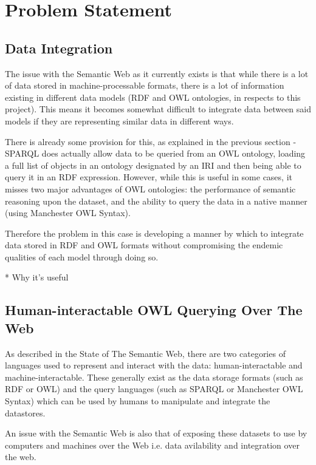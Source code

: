 \documentclass{article}
\begin{document}
\section{Problem Statement}

\subsection{Data Integration}

The issue with the Semantic Web as it currently exists is that while there is a
lot of data stored in machine-processable formats, there is a lot of information 
existing in different data models (RDF and OWL ontologies, in respects to this project). 
This means it becomes somewhat difficult to integrate data between said models 
if they are representing similar data in different ways.

There is already some provision for this, as explained in the previous section - 
SPARQL does actually allow data to be queried from an OWL ontology, loading a full 
list of objects in an ontology designated by an IRI and then being able to query 
it in an RDF expression. However, while this is useful in some cases, it misses 
two major advantages of OWL ontologies: the performance of semantic reasoning
upon the dataset, and the ability to query the data in a native manner (using 
Manchester OWL Syntax).

Therefore the problem in this case is developing a manner by which to integrate
data stored in RDF and OWL formats without compromising the endemic qualities of 
each model through doing so.

* Why it's useful

\subsection{Human-interactable OWL Querying Over The Web}

As described in the State of The Semantic Web, there are two categories of
languages used to represent and interact with the data: human-interactable and
machine-interactable. These generally exist as the data storage formats (such as
RDF or OWL) and the query languages (such as SPARQL or Manchester OWL Syntax)
which can be used by humans to manipulate and integrate the datastores.

An issue with the Semantic Web is also that of exposing these datasets to use by
computers and machines over the Web i.e. data avilability and integration over
the web.
\end{document}
